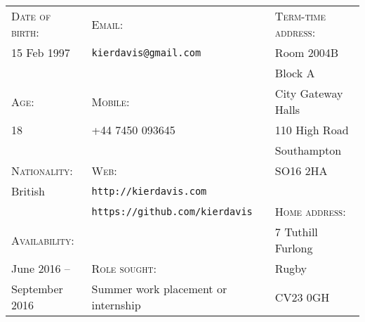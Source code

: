 \hrulefill
\vspace{1em}

{
\newcommand{\h}[1]{\textsc{#1}:}
\newcommand{\n}[1]{\hspace{.8em} #1}
\begin{tabu} to \textwidth {X[1.3,l] X[2.5,l] X[1.5,l]}
    \h{Date of birth}  & \h{Email}                                 & \h{Term-time address}  \\
    \n{15 Feb 1997}    & \n{\texttt{kierdavis@gmail.com}}          & \n{Room 2004B}         \\
                       &                                           & \n{Block A}            \\
    \h{Age}            & \h{Mobile}                                & \n{City Gateway Halls} \\
    \n{18}             & \n{+44 7450 093645}                       & \n{110 High Road}      \\
                       &                                           & \n{Southampton}        \\
    \h{Nationality}    & \h{Web}                                   & \n{SO16 2HA}           \\
    \n{British}        & \n{\texttt{http://kierdavis.com}}         &                        \\
                       & \n{\texttt{https://github.com/kierdavis}} & \h{Home address}       \\
    \h{Availability}   &                                           & \n{7 Tuthill Furlong}  \\
    \n{June 2016 --}   & \h{Role sought}                           & \n{Rugby}              \\
    \n{September 2016} & \n{Summer work placement or internship}   & \n{CV23 0GH}           \\
\end{tabu}
}

\vspace{1em}
\hrulefill
